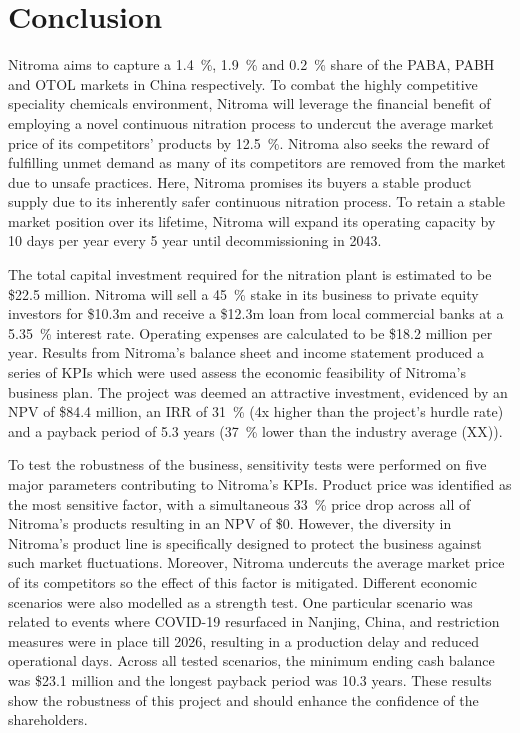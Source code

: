 \section{Conclusion}
Nitroma aims to capture a \SI{1.4}{\percent}, \SI{1.9}{\percent} and \SI{0.2}{\percent} share of the PABA, PABH and OTOL markets in China respectively. To combat the highly competitive speciality chemicals environment, Nitroma will leverage the financial benefit of employing a novel continuous nitration process to undercut the average market price of its competitors’ products by \SI{12.5}{\percent}. Nitroma also seeks the reward of fulfilling unmet demand as many of its competitors are removed from the market due to unsafe practices. Here, Nitroma promises its buyers a stable product supply due to its inherently safer continuous nitration process. To retain a stable market position over its lifetime, Nitroma will expand its operating capacity by 10 days per year every 5 year until decommissioning in 2043.

The total capital investment required for the nitration plant is estimated to be \$22.5 million. Nitroma will sell a \SI{45}{\percent} stake in its business to private equity investors for \$10.3m and receive a \$12.3m loan from local commercial banks at a \SI{5.35}{\percent} interest rate. Operating expenses are calculated to be \$18.2 million per year.  Results from Nitroma’s balance sheet and income statement produced a series of KPIs which were used assess the economic feasibility of Nitroma’s business plan. The project was deemed an attractive investment, evidenced by an NPV of \$84.4 million, an IRR of \SI{31}{\percent} (4x higher than the project’s hurdle rate) and a payback period of 5.3 years (\SI{37}{\percent} lower than the industry average (XX)).

To test the robustness of the business, sensitivity tests were performed on five major parameters contributing to Nitroma’s KPIs. Product price was identified as the most sensitive factor, with a simultaneous \SI{33}{\percent} price drop across all of Nitroma's products resulting in an NPV of \$0. However, the diversity in Nitroma’s product line is specifically designed to protect the business against such market fluctuations. Moreover, Nitroma undercuts the average market price of its competitors so the effect of this factor is mitigated. Different economic scenarios were also modelled as a strength test. One particular scenario was related to events where COVID-19 resurfaced in Nanjing, China, and restriction measures were in place till 2026, resulting in a production delay and reduced operational days. Across all tested scenarios, the minimum ending cash balance was \$23.1 million and the longest payback period was 10.3 years. These results show the robustness of this project and should enhance the confidence of the shareholders.